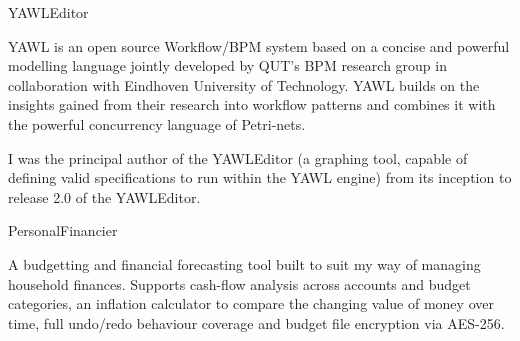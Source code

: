 \documentclass{portfolio}
\begin{document}
  \vfillForced

 
  \vfillForced
  
  \begin{ContactDetails}
  \end{ContactDetails}
  
  \vfillForced

  \tableofcontents 

  \vfillForced
  
  \begin{Projects}
    \begin{Project}{YAWLEditor}
      \begin{ProjectOverview}
        YAWL is an open source Workflow/BPM system based on a concise and powerful modelling language jointly developed by QUT's BPM research group in 
        collaboration with Eindhoven University of Technology.  YAWL builds on the insights gained from their research into workflow patterns and 
        combines it with the powerful concurrency language of Petri-nets.  

        I was the principal author of the YAWLEditor (a graphing tool, capable of defining valid specifications to run within the YAWL engine) from its inception to 
        release 2.0 of the YAWLEditor. 
      \end{ProjectOverview}
    \end{Project}
    \begin{Project}{PersonalFinancier}
      \begin{ProjectOverview}
        A budgetting and financial forecasting tool built to suit my way of managing household finances.
        Supports cash-flow analysis across accounts and budget categories, an inflation calculator to compare
        the changing value of money over time, full undo/redo behaviour coverage and budget file encryption via AES-256. 


\end{ProjectOverview}
\end{Project}
\end{Projects}
\end{document}
